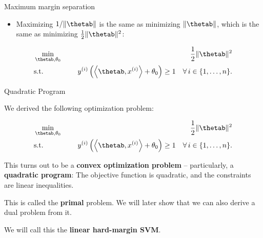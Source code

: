 \begin{vbframe}{Maximum margin separation}
 \begin{itemize}
  \item Maximizing $1 / \|\thetab\|$ is the same as minimizing $\|\thetab\|$, which is the same as minimizing $\frac{1}{2}\|\thetab\|^2$:
  \end{itemize}

\begin{eqnarray*}
  & \min\limits_{\thetab, \theta_0} \quad & \frac{1}{2} \|\thetab\|^2 \\
   & \text{s.t.} & \,\,\yi  \left( \scp{\thetab}{\xi} + \theta_0 \right) \geq 1 \quad \forall\, i \in \nset.
\end{eqnarray*}

\end{vbframe}

\begin{vbframe}{Quadratic Program}

We derived the following optimization problem:

  \begin{eqnarray*}
  & \min\limits_{\thetab, \theta_0} \quad & \frac{1}{2} \|\thetab\|^2 \\
  & \text{s.t.} & \,\,\yi  \left( \scp{\thetab}{\xi} + \theta_0 \right) \geq 1 \quad \forall\, i \in \nset.
\end{eqnarray*}

This turns out to be a \textbf{convex optimization problem} -- particularly, a \textbf{quadratic program}: The objective function is quadratic, and the constraints are linear inequalities.

\lz

This is called the \textbf{primal} problem. We will later show that we can also derive a dual problem from it.

\lz

We will call this the \textbf{linear hard-margin SVM}.
\end{vbframe}

